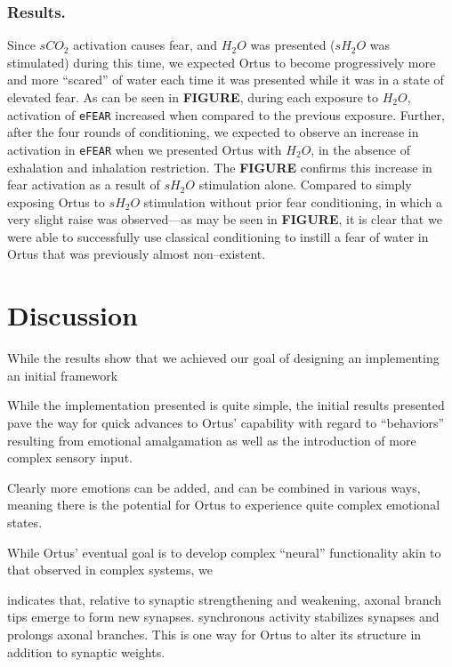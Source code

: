 \documentclass[letterpaper]{article}
\begin{document}
\subsubsection{Results.} Since $sCO_2$ activation causes fear, and $H_2O$ was presented ($sH_2O$ was stimulated) during this time, we expected Ortus to become progressively more and more ``scared'' of water each time it was presented while it was in a state of elevated fear.
As can be seen in \textbf{FIGURE}, during each exposure to $H_2O$, activation of \texttt{eFEAR} increased when compared to the previous exposure.
Further, after the four rounds of conditioning, we expected to observe an increase in activation in \texttt{eFEAR} when we presented Ortus with $H_2O$, in the absence of exhalation and inhalation restriction. The \textbf{FIGURE} confirms this increase in fear activation as a result of $sH_2O$ stimulation alone. Compared to simply exposing Ortus to $sH_2O$ stimulation without prior fear conditioning, in which a very slight raise was observed---as may be seen in \textbf{FIGURE}, it is clear that we were able to successfully use classical conditioning to instill a fear of water in Ortus that was previously almost non--existent. 


\section{Discussion}

While the results show that we achieved our goal of designing an implementing an initial framework 

While the implementation presented is quite simple, the initial results presented pave the way for quick advances to Ortus' capability with regard to ``behaviors'' resulting from emotional amalgamation as well as the introduction of more complex sensory input.


Clearly more emotions can be added, and can be combined in various ways, meaning there is the potential for Ortus to experience quite complex emotional states.

While Ortus' eventual goal is to develop complex ``neural'' functionality akin to that observed in complex systems, we

\citet{Kutsarova2016} indicates that, relative to synaptic strengthening and weakening, axonal branch tips emerge to form new synapses. synchronous activity stabilizes synapses and prolongs axonal branches. This is one way for Ortus to alter its structure in addition to synaptic weights.
\end{document}
